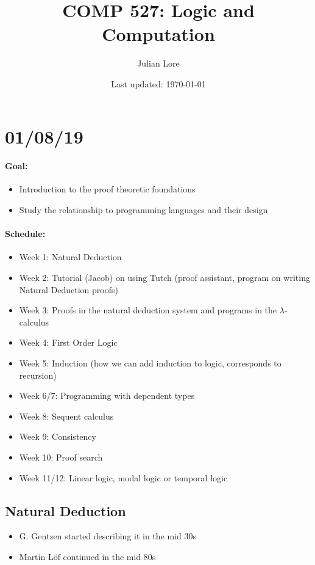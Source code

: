 \documentclass[12 pt]{article}
\author{Julian Lore}
\date{Last updated: \today}
\title{COMP 527: Logic and Computation}
\begin{document}
\onehalfspacing
\maketitle
\tableofcontents
\section{01/08/19}
\paragraph{Goal:}
\begin{itemize}
	\item Introduction to the proof theoretic foundations
	\item Study the relationship to programming languages and their
	      design
\end{itemize}
\paragraph{Schedule:}
\begin{itemize}
	\item Week 1: Natural Deduction
	\item Week 2: Tutorial (Jacob) on using Tutch (proof assistant,
	      program on writing Natural Deduction proofs)
	\item Week 3: Proofs in the natural deduction system and programs
	      in the $\lambda$-calculus
	\item Week 4: First Order Logic
	\item Week 5: Induction (how we can add induction to logic,
	      corresponds to recursion)
	\item Week 6/7: Programming with dependent types
	\item Week 8: Sequent calculus
	\item Week 9: Consistency
	\item Week 10: Proof search
	\item Week 11/12: Linear logic, modal logic or temporal logic
\end{itemize}
\subsection{Natural Deduction}
\begin{itemize}
	\item G. Gentzen started describing it in the mid 30s
	\item Martin L\"of continued in the mid 80s
\end{itemize}
\end{document}
